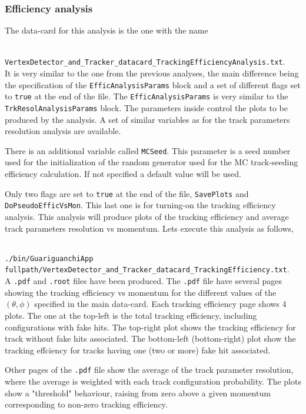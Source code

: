 \subsubsection*{Efficiency analysis}

The data-card for this analysis is the one with the name

~\\
{\small {\tt VertexDetector\_and\_Tracker\_datacard\_TrackingEfficiencyAnalysis.txt}}.
~\\

\noindent
It is very similar to the one from the previous analyses, the main difference being the specification of the {\tt EfficAnalysisParams} block and a set of different flags set to {\tt true}
at the end of the file. The {\tt EfficAnalysisParams} is very similar to the {\tt TrkResolAnalysisParams} block. The parameters inside control the plots to be produced by the analysis. A set of 
similar variables as for the track parameters resolution analysis are available.

There is an additional variable called {\tt MCSeed}. This parameter is a seed number used for the initialization of the random generator used for the MC track-seeding efficiency calculation. 
If not specified a default value will be used.

Only two flags are set to {\tt true} at the end of the file, {\tt SavePlots} and {\tt DoPseudoEfficVsMon}. This last one is for turning-on the tracking efficiency analysis. This 
analysis will produce plots of the tracking efficiency and average track parameters resolution vs momentum. Lets execute this analysis as follows,

~\\
{\small {\tt ./bin/GuariguanchiApp  fullpath/VertexDetector\_and\_Tracker\_datacard\_TrackingEfficiency.txt}}.
~\\

\noindent
A {\tt .pdf} and {\tt .root} files have been produced. The {\tt .pdf} file have several pages showing the tracking efficiency vs momentum for the different values of the $(\theta,\phi)$ 
specified in the main data-card. Each tracking efficiency page shows 4 plots. The one at the top-left is the total tracking efficiency, including configurations with fake hits. The 
top-right plot shows the tracking efficiency for track without fake hits associated. The bottom-left (bottom-right) plot show the tracking effciency for tracks having one (two or more) 
fake hit associated.

Other pages of the {\tt .pdf} file show the average of the track parameter resolution, where the average is weighted with each track configuration probability. The plots show a "threshold" behaviour, raising 
from zero above a given momentum corresponding to non-zero tracking efficiency.

